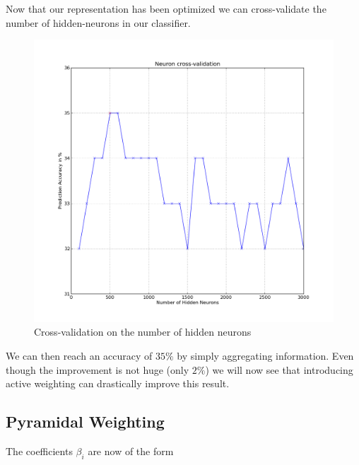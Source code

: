 \documentclass[a4paper]{report}
\begin{document}
Now that our representation has been optimized we can cross-validate the number of hidden-neurons in our classifier.

\begin{figure}[H]
\begin{center}
\includegraphics[scale=0.3]{cross_neuron_S2_agreg.png}\caption{Cross-validation on the number of hidden neurons}
\end{center}
\end{figure}
We can then reach an accuracy of $35\%$ by simply aggregating information. Even though the improvement is not huge (only $2\%$) we will now see that introducing active weighting can drastically improve this result.
\subsection{Pyramidal Weighting}
The coefficients $\beta_i$ are now of the form 
\end{document}
